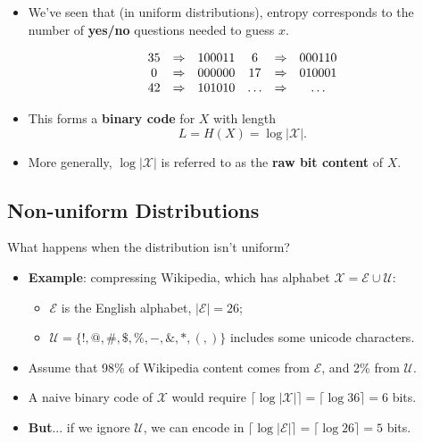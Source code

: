 \begin{itemize}
    \item We’ve seen that (in uniform distributions), entropy corresponds to the number of \textbf{yes/no} questions needed to guess \( x \).

          \[
              \begin{array}{c@{\quad\Rightarrow\quad}c@{\quad}c@{\quad\Rightarrow\quad}c}
                  35 & 100011 & 6     & 000110 \\
                  0  & 000000 & 17    & 010001 \\
                  42 & 101010 & \dots & \dots  \\
              \end{array}
          \]

    \item This forms a \textbf{binary code} for \( X \) with length
          \[
              L = H(X) = \log |\mathcal{X}|.
          \]

    \item More generally, \( \log |\mathcal{X}| \) is referred to as the \textbf{raw bit content} of \( X \).
\end{itemize}



\subsection{Non-uniform Distributions}

What happens when the distribution isn’t uniform?



\begin{itemize}
    \item \textbf{Example}: compressing Wikipedia, which has alphabet \( \mathcal{X} = \mathcal{E} \cup \mathcal{U} \):
          \begin{itemize}
              \item \( \mathcal{E} \) is the English alphabet, \( |\mathcal{E}| = 26 \);
              \item \( \mathcal{U} = \{ !, @, \#, \$, \%, -, \&, *, (, ) \} \) includes some unicode characters.
          \end{itemize}

    \item Assume that 98\% of Wikipedia content comes from \( \mathcal{E} \), and 2\% from \( \mathcal{U} \).

    \item A naive binary code of \( \mathcal{X} \) would require \( \lceil \log |\mathcal{X}| \rceil = \lceil \log 36 \rceil = 6 \) bits.

    \item \textbf{But}... if we ignore \( \mathcal{U} \), we can encode in \( \lceil \log |\mathcal{E}| \rceil = \lceil \log 26 \rceil = 5 \) bits.
\end{itemize}

